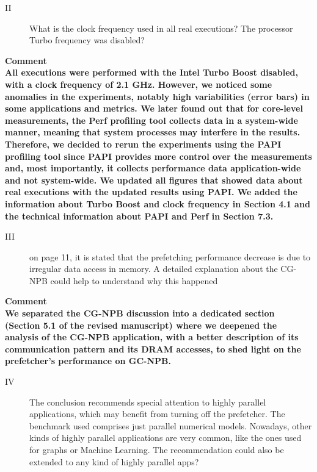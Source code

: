 \documentclass{article}
\newcounter{answer}
\newenvironment{answer}
{ \refstepcounter{answer}\vspace{0.5cm}\bfseries\noindent Comment~\theanswer\\ }
{ \vspace{0.5cm} }
\begin{document}
\begin{description}
    \item[II] What is the clock frequency used in all real executions? The processor Turbo frequency was disabled?
\end{description}

\begin{answer}

All executions were performed with the Intel Turbo Boost disabled, with a clock frequency of 2.1 GHz. However, we noticed some anomalies in the experiments, notably high variabilities (error bars) in some applications and metrics. We later found out that for core-level measurements, the Perf profiling tool collects data in a system-wide manner, meaning that system processes may interfere in the results. Therefore, we decided to rerun the experiments using the PAPI profiling tool since PAPI provides more control over the measurements and, most importantly, it collects performance data application-wide and not system-wide. We updated all figures that showed data about real executions with the updated results using PAPI. We added the information about Turbo Boost and clock frequency in Section 4.1 and the technical information about PAPI and Perf in Section 7.3.

\end{answer}

\begin{description}
    \item[III] on page 11, it is stated that the prefetching performance decrease is due to irregular data access in memory. A detailed explanation about the CG-NPB could help to understand why this happened
\end{description}

\begin{answer}

We separated the CG-NPB discussion into a dedicated section (Section 5.1 of the revised manuscript) where we deepened the analysis of the CG-NPB application, with a better description of its communication pattern and its DRAM accesses, to shed light on the prefetcher's performance on GC-NPB.

\end{answer}

\begin{description}
    \item[IV] The conclusion recommends special attention to highly parallel applications, which may benefit from turning off the prefetcher. The benchmark used comprises just parallel numerical models. Nowadays, other kinds of highly parallel applications are very common, like the ones used for graphs or Machine Learning. The recommendation could also be extended to any kind of highly parallel apps?
\end{description}
\end{document}

